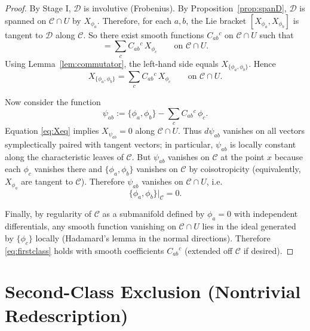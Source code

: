 \documentclass[11pt]{article}
\theoremstyle{remark}
\theoremstyle{plain}
\begin{document}
\begin{proof}
By Stage I, $\mathcal{D}$ is involutive (Frobenius).
By Proposition~\ref{prop:spanD}, $\mathcal{D}$ is spanned on $\mathcal{C}\cap U$ by $X_{\phi_a}$.
Therefore, for each $a,b$, the Lie bracket $[X_{\phi_a},X_{\phi_b}]$ is tangent to $\mathcal{D}$ along $\mathcal{C}$.
So there exist smooth functions $C_{ab}{}^{c}$ on $\mathcal{C}\cap U$ such that
\begin{equation}
[X_{\phi_a},X_{\phi_b}] = \sum_c C_{ab}{}^{c}\,X_{\phi_c}
\qquad \text{on } \mathcal{C}\cap U.
\label{eq:bracket-span}
\end{equation}
Using Lemma~\ref{lem:commutator}, the left-hand side equals $X_{\{\phi_a,\phi_b\}}$.
Hence
\begin{equation}
X_{\{\phi_a,\phi_b\}} = \sum_c C_{ab}{}^{c}\,X_{\phi_c}
\qquad \text{on } \mathcal{C}\cap U.
\label{eq:Xeq}
\end{equation}

Now consider the function
\begin{equation}
\psi_{ab}:=\{\phi_a,\phi_b\}-\sum_c C_{ab}{}^{c}\,\phi_c.
\end{equation}
Equation \eqref{eq:Xeq} implies $X_{\psi_{ab}}=0$ along $\mathcal{C}\cap U$.
Thus $d\psi_{ab}$ vanishes on all vectors symplectically paired with tangent vectors; in particular, $\psi_{ab}$ is locally constant along the characteristic leaves of $\mathcal{C}$.
But $\psi_{ab}$ vanishes on $\mathcal{C}$ at the point $x$ because each $\phi_c$ vanishes there and $\{\phi_a,\phi_b\}$ vanishes on $\mathcal{C}$ by coisotropicity (equivalently, $X_{\phi_a}$ are tangent to $\mathcal{C}$).
Therefore $\psi_{ab}$ vanishes on $\mathcal{C}\cap U$, i.e.\
\begin{equation}
\{\phi_a,\phi_b\}\big|_{\mathcal{C}} = 0.
\end{equation}

Finally, by regularity of $\mathcal{C}$ as a submanifold defined by $\phi_a=0$ with independent differentials, any smooth function vanishing on $\mathcal{C}\cap U$ lies in the ideal generated by $\{\phi_c\}$ locally (Hadamard's lemma in the normal directions).
Therefore \eqref{eq:firstclass} holds with smooth coefficients $C_{ab}{}^{c}$ (extended off $\mathcal{C}$ if desired).
\end{proof}

\section{Second-Class Exclusion (Nontrivial Redescription)}
\end{document}
